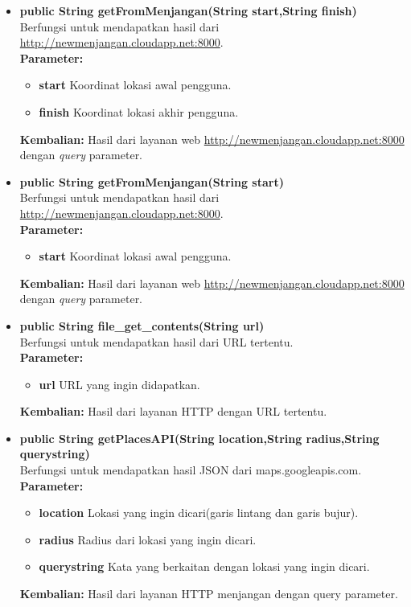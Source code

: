 \begin{enumerate}
\begin{itemize}
		\item \textbf{public String getFromMenjangan(String start,String finish)}\\
		Berfungsi untuk mendapatkan hasil dari \url{http://newmenjangan.cloudapp.net:8000}.\\
		\textbf{Parameter:}
				\begin{itemize}
					\item \textbf{start} Koordinat lokasi awal pengguna.
					\item \textbf{finish} Koordinat lokasi akhir pengguna.
				\end{itemize}
		\textbf{Kembalian:}  Hasil dari layanan web \url{http://newmenjangan.cloudapp.net:8000} dengan \textit{query} parameter.
		
		\item \textbf{public String getFromMenjangan(String start)}\\
		Berfungsi untuk mendapatkan hasil dari \url{http://newmenjangan.cloudapp.net:8000}.\\
		\textbf{Parameter:}
				\begin{itemize}
					\item \textbf{start} Koordinat lokasi awal pengguna.
				\end{itemize}
		\textbf{Kembalian:}  Hasil dari layanan web \url{http://newmenjangan.cloudapp.net:8000} dengan \textit{query} parameter.
		
		\item \textbf{public String file\_get\_contents(String url)}\\
		Berfungsi untuk mendapatkan hasil dari URL tertentu.\\
		\textbf{Parameter:}
				\begin{itemize}
					\item \textbf{url} URL yang ingin didapatkan.
				\end{itemize}
		\textbf{Kembalian:}  Hasil dari layanan HTTP dengan URL tertentu.
		
		\item \textbf{public String getPlacesAPI(String location,String radius,String querystring)}\\
		Berfungsi untuk mendapatkan hasil JSON dari maps.googleapis.com.\\
		\textbf{Parameter:}
				\begin{itemize}
					\item \textbf{location} Lokasi yang ingin dicari(garis lintang dan garis bujur).
					\item \textbf{radius} Radius dari lokasi yang ingin dicari.
					\item \textbf{querystring} Kata yang berkaitan dengan lokasi yang ingin dicari.
				\end{itemize}
		\textbf{Kembalian:}  Hasil dari layanan HTTP menjangan dengan query parameter.
		

\end{itemize}
\end{enumerate}
